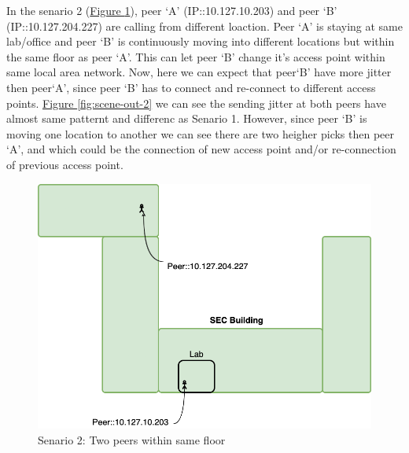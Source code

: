 	In the senario 2 (\hyperref[fig:scene-2]{Figure \ref{fig:scene-2}}), peer `A' (IP::10.127.10.203) and peer `B' (IP::10.127.204.227) are calling from different loaction. Peer `A' is staying at same lab/office and peer `B' is continuously moving into different locations but within the same floor as peer `A'. This can let peer `B' change it's access point within same local area network. Now, here we can expect that peer`B' have more jitter then peer`A', since peer `B' has to connect and re-connect to different access points. \hyperref[fig:scene-out-2]{Figure \ref{fig:scene-out-2}} we can see the sending jitter at both peers have almost same patternt and differenc as Senario 1. However, since peer `B' is moving one location to another we can see there are two heigher picks then peer `A', and which could be the connection of new access point and/or re-connection of previous access point.
	\begin{figure}[tbh]
		\begin{minipage}{\textwidth}
			\includegraphics[scale=0.29]{Images/experiment/senarios/in_floor.drawio.png}
		\end{minipage}
		\caption{Senario 2: Two peers within same floor}
		\label{fig:scene-2}
	\end{figure}


